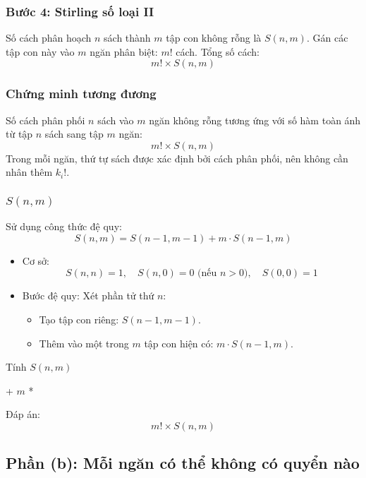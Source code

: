 \documentclass[a4paper,12pt]{article}
\theoremstyle{plain}
\theoremstyle{definition}
\begin{document}
\subsubsection*{Bước 4: Stirling số loại II}
Số cách phân hoạch \( n \) sách thành \( m \) tập con không rỗng là \( S(n,m) \). Gán các tập con này vào \( m \) ngăn phân biệt: \( m! \) cách. Tổng số cách:
\[
m! \times S(n,m)
\]

\subsubsection*{Chứng minh tương đương}
Số cách phân phối \( n \) sách vào \( m \) ngăn không rỗng tương ứng với số hàm toàn ánh từ tập \( n \) sách sang tập \( m \) ngăn:
\[
m! \times S(n,m)
\]
Trong mỗi ngăn, thứ tự sách được xác định bởi cách phân phối, nên không cần nhân thêm \( k_i! \).

\subsubsection*{\( S(n,m) \)}
Sử dụng công thức đệ quy:
\[
S(n,m) = S(n-1,m-1) + m \cdot S(n-1,m)
\]
\begin{itemize}
    \item Cơ sở:
    \[
    S(n,n) = 1, \quad S(n,0) = 0 \text{ (nếu } n > 0\text{)}, \quad S(0,0) = 1
    \]
    \item Bước đệ quy: Xét phần tử thứ \( n \):
    \begin{itemize}
        \item Tạo tập con riêng: \( S(n-1,m-1) \).
        \item Thêm vào một trong \( m \) tập con hiện có: \( m \cdot S(n-1,m) \).
    \end{itemize}
\end{itemize}

\begin{algorithm}
\caption{Tính \( S(n,m) \)}
\begin{algorithmic}
     
     
    \EndIf
    \State \Return {} + $m$ * 
\EndFunction
\end{algorithmic}
\end{algorithm}

Đáp án:
\[
\boxed{m! \times S(n,m)}
\]

\subsection*{Phần (b): Mỗi ngăn có thể không có quyển nào}
\end{document}
